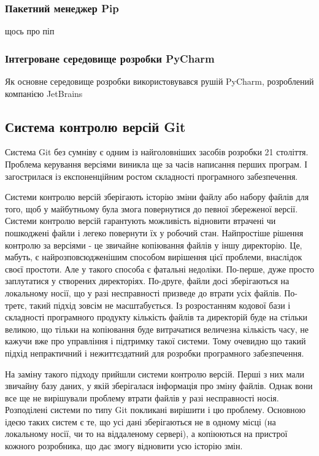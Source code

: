 \subsubsection{Пакетний менеджер Pip}
щось про піп

\subsubsection{Інтегроване середовище розробки PyCharm}
Як основне середовище розробки використовувався рушій PyCharm, 
розроблений компанією JetBrains

\subsection{Система контролю версій Git}
Система Git без сумніву є одним із найголовніших засобів розробки 21 століття. Проблема
керування версіями виникла ще за часів написання перших програм. І загострилася із
експоненційним ростом складності програмного забезпечення.

Системи контролю версій зберігають історію зміни файлу або набору файлів для того,
щоб у майбутньому була змога
повернутися до певної збереженої версії. Системи контролю версій гарантують можливість
відновити втрачені чи пошкоджені файли і легеко повернути їх у робочий стан. Найпростіше
рішення контролю за версіями - це звичайне копіювання файлів у іншу директорію. Це, мабуть,
є найрозповсюдженішим способом вирішення цієї проблеми, внаслідок своєї простоти.
Але у такого способа є фатальні недоліки. По-перше, дуже просто заплутатися у створених
директоріях. По-друге, файли досі зберігаються на локальному носії, що у разі
несправності призведе до втрати усіх файлів. По-третє, такий підхід зовсім 
не масштабується. Із розростанням кодової бази і складності програмного продукту кількість
файлів та директорій буде на стільки великою, що тільки на копіювання буде витрачатися
величезна кількість часу, не кажучи вже про управління і підтримку такої системи.
Тому очевидно що такий підхід непрактичний і нежиттєздатний для розробки програмного
забезпечення.

На заміну такого підходу прийшли системи контролю версій. Перші з них мали звичайну
базу даних, у якій зберігалася інформація про зміну файлів. Однак вони все ще не
вирішували проблему втрати файлів у разі несправності носія. Розподілені системи
по типу Git покликані вирішити і цю проблему. Основною ідеєю таких систем є те, що
усі дані зберігаються не в одному місці (на локальному носії, чи то на віддаленому
сервері), а копіюються на пристрої кожного розробника, що дає змогу відновити усю історію
змін.

